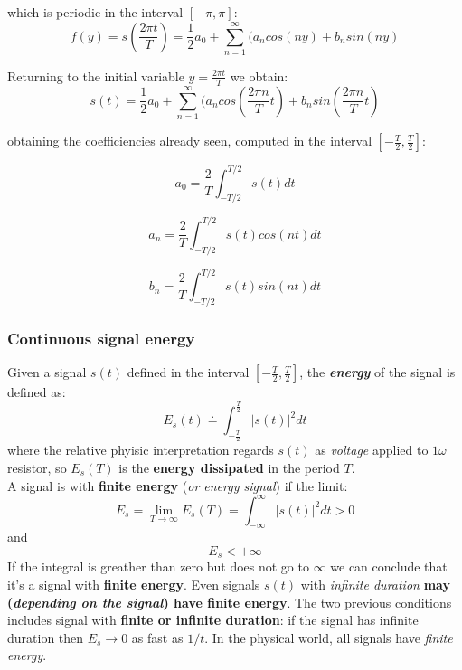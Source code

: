 \documentclass[10pt,a4paper]{report}
\theoremstyle{definition}
\begin{document}
which is periodic in the interval $[-\pi, \pi]$:
\begin{equation}
	f(y) = s(\frac{2\pi t}{T}) = \frac{1}{2}a_{0}+\sum_{n=1}^{\infty}(a_{n}cos(ny)+b_{n}sin(ny)
\end{equation}

Returning to the initial variable $y = \frac{2\pi t}{T}$ we obtain:
\begin{equation}
	s(t) = \frac{1}{2}a_{0}+\sum_{n=1}^{\infty}(a_{n}cos(\frac{2\pi n}{T}t)+b_{n}sin(\frac{2\pi n}{T}t)
\end{equation}

obtaining the coefficiencies already seen, computed in the interval $[-\frac{T}{2}, \frac{T}{2}]$:
\begin{center}
	
	\begin{equation}
			a_{0} = \frac{2}{T} \int_{-T/2}^{T/2} s(t)dt
	\end{equation}

	 
	\begin{equation}
		a_{n}= \frac{2}{T}\int_{-T/2}^{T/2} s(t)cos(nt)dt
	\end{equation}

	 
		\begin{equation}
				b_{n}=\frac{2}{T}\int_{-T/2}^{T/2} s(t)sin(nt)dt
		\end{equation}

\end{center}
\subsubsection{Continuous signal energy}\label{sec:continuous-signal-energy}
Given a signal $s(t)$ defined in the interval $[-\frac{T}{2}, \frac{T}{2}]$, the \textit{\textbf{energy}} of the signal is defined as:
\begin{equation}
	E_{s}(t) \doteq \int_{-\frac{T}{2}}^{\frac{T}{2}}|s(t)|^{2}dt
\end{equation}
where the relative phyisic interpretation regards $s(t)$ as \textit{voltage} applied to $1 \omega$ resistor, so $E_{s}(T)$ is the \textbf{energy dissipated} in the period $T$. \\
A signal is with \textbf{finite energy} (\textit{or energy signal}) if the limit:
\begin{equation}
	E_{s} = \lim_{T \rightarrow \infty}E_{s}(T) = \int_{-\infty}^{\infty} |s(t)|^{2}dt > 0
\end{equation}
and 
\begin{equation}
	E_{s} < +\infty
\end{equation}
If the integral is greather than zero but does not go to $\infty$ we can conclude that it's a signal with \textbf{finite energy}. Even signals $s(t)$ with \textit{infinite duration} \textbf{may (\textit{depending on the signal}) have finite energy}.
The two previous conditions includes signal with \textbf{finite or infinite duration}: if the signal has infinite duration then $E_{s} \rightarrow 0$ as fast as $1/t$. In the physical world, all signals have \textit{finite energy}. 
\end{document}
